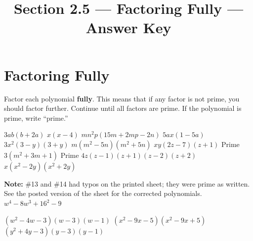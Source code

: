 

\title{Section 2.5 --- Factoring Fully --- Answer Key}


\maketitle
\section*{Factoring Fully}
Factor each polynomial \textbf{fully}.  This means that if any factor is not prime, you should factor further.  Continue until all factors are prime.  If the polynomial is prime, write ``prime.''
\begin{smenum}
\mitemxxx
{$3ab(b+2a)$}
{$x(x-4)$}
{$mn^2p(15m+2mp-2n)$}
\mitemxxx
{$5ax(1-5a)$}
{$3x^2(3-y)(3+y)$}
{$m(m^2-5n)(m^2+5n)$}
\mitemxxx
{$xy(2z-7)(z+1)$}
{Prime}
{$3(m^2+3m+1)$}
\mitemxxx
{Prime}
{$4z(z-1)(z+1)(z-2)(z+2)$}
{$x(x^2-2y)(x^2+2y)$}
\end{smenum}
\textbf{Note:} \#13 and \#14 had typos on the printed sheet; they were prime as written. See the posted version of the sheet for the corrected polynomials.{$w^4-8w^3+16^2-9$}
\begin{smenum}
\mitemxxx
{$(w^2-4w-3)(w-3)(w-1)$}
{$(x^2-9x-5)(x^2-9x+5)$}
{$(y^2+4y-3)(y-3)(y-1)$}
\end{smenum}

